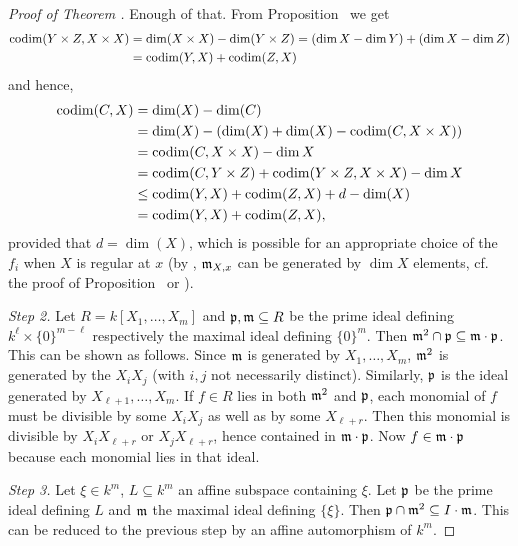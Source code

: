 \documentclass[a4paper,parskip=half,numbers=enddot, DIV=12]{scrreprt}
\begin{document}
\begin{proof}[Proof of Theorem ]
    Enough of that. From Proposition~ we get
    \begin{align*}
    	\operatorname{codim}(Y\times Z,X\times X)&=\dim(X\times X)-\dim(Y\times Z)=(\dim X-\dim Y)+(\dim X-\dim Z)\\
    	&=\operatorname{codim}(Y,X)+\operatorname{codim}(Z,X)
    \end{align*}
    and hence, 
    \begin{align*}
        \operatorname{codim}(C,X)& = \dim(X) -\dim(C)\\
        &= \dim (X) - (\dim(X)+\dim(X) -\operatorname{codim}(C,X\times X))\\
        &= \operatorname{codim}(C,X\times X) -\dim X\\
        &=\operatorname{codim}(C,Y\times Z)+\operatorname{codim}(Y\times Z,X\times X)-\dim X\\
        &\leq \operatorname{codim}(Y,X) +\operatorname{codim}(Z,X) +d-\dim(X) \\
        &=\operatorname{codim}(Y,X) +\operatorname{codim}(Z,X),
    \end{align*}
    provided that $d=\dim(X)$, which is possible for an appropriate choice of the $f_i$ when $X$ is regular at $x$ (by \NAK, $\mathfrak{m}_{X,x}$ can be generated by $\dim X$ elements, cf. the proof of Proposition~ or \cite[Concluding remarks, Lemma~1]{alg1}).
    
    \emph{Step 2.} Let $R= k[X_1,\ldots, X_m]$ and $\mathfrak{p},\mathfrak{m}\subseteq R$ be the prime ideal defining $k^\ell \times \{0\}^{m-\ell}$ respectively the maximal ideal defining $\{0\}^m$. Then $\mathfrak{m}^2 \cap \mathfrak{p} \subseteq \mathfrak{m}\cdot\mathfrak{p}$. This can be shown as follows. Since $\mathfrak{m}$ is generated by $X_1,\ldots,X_m$, $\mathfrak{m}^2$ is generated by the $X_iX_j$ (with $i,j$ not necessarily distinct). Similarly, $\mathfrak{p}$ is the ideal generated by $X_{\ell+1},\ldots, X_m$. If $f\in R$ lies in both $\mathfrak{m}^2$ and $\mathfrak{p}$, each monomial of $f$ must be divisible by some $X_iX_j$ as well as by some $X_{\ell+r}$. Then this monomial is divisible by $X_iX_{\ell+r}$ or $X_jX_{\ell+r}$, hence contained in $\mathfrak{m}\cdot\mathfrak{p}$. Now $f\in\mathfrak{m}\cdot\mathfrak{p}$ because each monomial lies in that ideal.
       
   \emph{Step 3.} Let $\xi\in k^m$, $L\subseteq k^m$ an affine subspace containing $\xi$. Let $\mathfrak{p}$ be the prime ideal defining $L$ and $\mathfrak{m}$ the maximal ideal defining $\{\xi\}$. Then $\mathfrak{p}\cap \mathfrak{m}^2 \subseteq I\cdot \mathfrak{m}$. This can be reduced to the previous step by an affine automorphism of $k^m$.
    

\end{proof}
\end{document}
